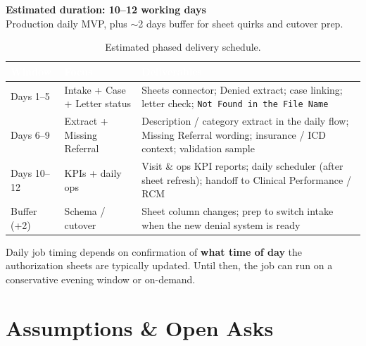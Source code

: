 \documentclass[11pt,a4paper]{article}
\begin{document}
\begin{tcolorbox}[statbox]
\begin{center}
{\Large\bfseries\color{PrimaryBlue}Estimated duration: 10--12 working days}\\[0.4em]
{\normalsize Production daily MVP, plus $\sim$2 days buffer for sheet quirks and cutover prep.}
\end{center}
\end{tcolorbox}

\begin{table}[h!]
\centering
\renewcommand{\arraystretch}{1.25}
\begin{tabularx}{\linewidth}{C{2.2cm} L{3.0cm} X}
\toprule
{}
\textcolor{white}{\bfseries Window} &
\textcolor{white}{\bfseries Focus} &
\textcolor{white}{\bfseries Deliverables} \\
\midrule
Days 1--5 &
Intake + Case + Letter status &
Sheets connector; Denied extract; case linking; letter check; \texttt{Not Found in the File Name} \\
Days 6--9 &
Extract + Missing Referral &
Description / category extract in the daily flow; Missing Referral wording; insurance / ICD context; validation sample \\
Days 10--12 &
KPIs + daily ops &
Visit \& ops KPI reports; daily scheduler (after sheet refresh); handoff to Clinical Performance / RCM \\
Buffer (+2) &
Schema / cutover &
Sheet column changes; prep to switch intake when the new denial system is ready \\
\bottomrule
\end{tabularx}
\caption{Estimated phased delivery schedule.}
\end{table}

\begin{tcolorbox}[rulebox,title={Dependency}]
Daily job timing depends on confirmation of \textbf{what time of day} the authorization
sheets are typically updated. Until then, the job can run on a conservative evening
window or on-demand.
\end{tcolorbox}


\section{Assumptions \& Open Asks}
\end{document}
